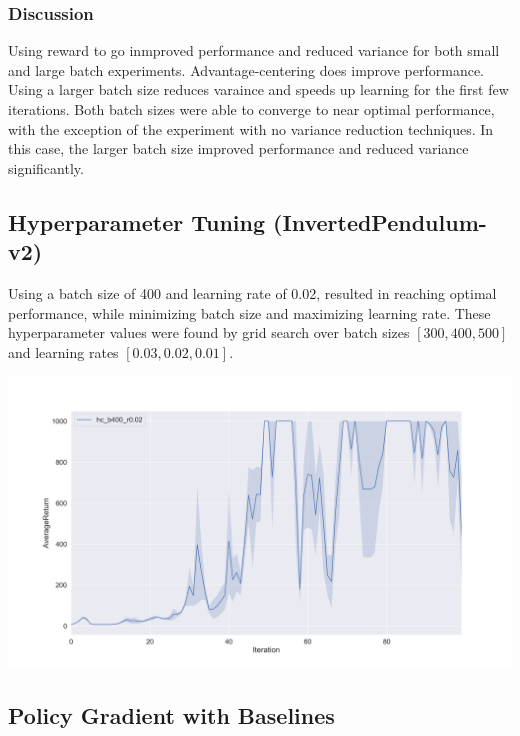 \documentclass{article}
\begin{document}
    \subsubsection{Discussion}
    Using reward to go inmproved performance and reduced variance for both 
    small and large batch experiments. Advantage-centering does improve performance.
    Using a larger batch size reduces varaince and speeds up learning for the 
    first few iterations. Both batch sizes were able to converge to near optimal 
    performance, with the exception of the experiment with no variance reduction 
    techniques. In this case, the larger batch size improved performance and reduced 
    variance significantly.

    \subsection{Hyperparameter Tuning (InvertedPendulum-v2)}
    Using a batch size of 400 and learning rate of 0.02, resulted in reaching 
    optimal performance, while minimizing batch size and maximizing learning rate.
    These hyperparameter values were found by grid search over 
    batch sizes $[300, 400, 500]$ and learning rates $[0.03, 0.02, 0.01]$.

    \begin{center}
        \noindent\includegraphics[scale=0.3]{hyperParamsInvertedPendulum}
    \end{center}

    \subsection{Policy Gradient with Baselines}
\end{document}
